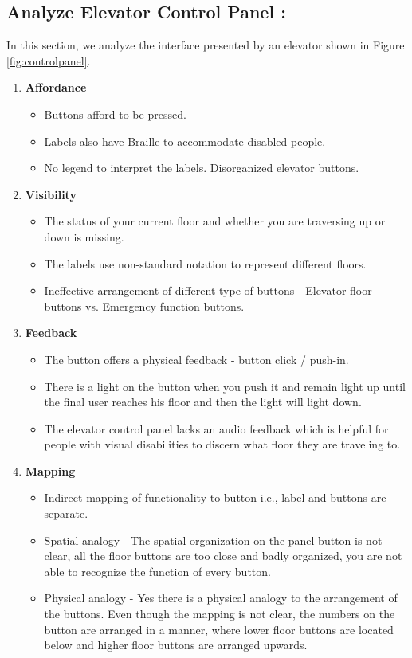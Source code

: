 \documentclass[10pt]{scrartcl}
\begin{document}
	\subsection{Analyze Elevator Control Panel : } In this section, we analyze the interface presented by an elevator shown in Figure \ref{fig:controlpanel}.
	\begin{enumerate}
		\item \textbf{Affordance} 
		\begin{itemize}
			\item Buttons afford to be pressed.
			\item Labels also have Braille to accommodate disabled people.
			\item No legend to interpret the labels. Disorganized elevator buttons.
		\end{itemize}
	
		\item \textbf{Visibility } 
			\begin{itemize}
			\item The status of your current floor and whether you are traversing up or down is missing.
			\item The labels use non-standard notation to represent different floors.
			\item Ineffective arrangement of different type of buttons - Elevator floor buttons vs. Emergency function buttons.
		\end{itemize}
		
			\item \textbf{Feedback} 
				\begin{itemize}
				\item The button offers a physical feedback - button click / push-in.
				\item There is a light on the button when you push it and remain light up until the final user reaches his floor and then the light will light down. 
				\item The elevator control panel lacks an audio feedback which is helpful for people with visual disabilities to discern what floor they are traveling to.
			   \end{itemize}
		   
				\item \textbf{Mapping} 
					\begin{itemize}
					\item Indirect mapping of functionality to button i.e., label and buttons are separate. 
					\item Spatial analogy - The spatial organization on the panel button is not clear, all the floor buttons are too close and badly organized, you are not able to recognize the function of every button.
					\item Physical analogy - Yes there is a physical analogy to the arrangement of the buttons. Even though the mapping is not clear, the numbers on the button are arranged in a manner, where lower floor buttons are located below and higher floor buttons are arranged upwards.
					

\end{itemize}
\end{enumerate}
\end{document}
